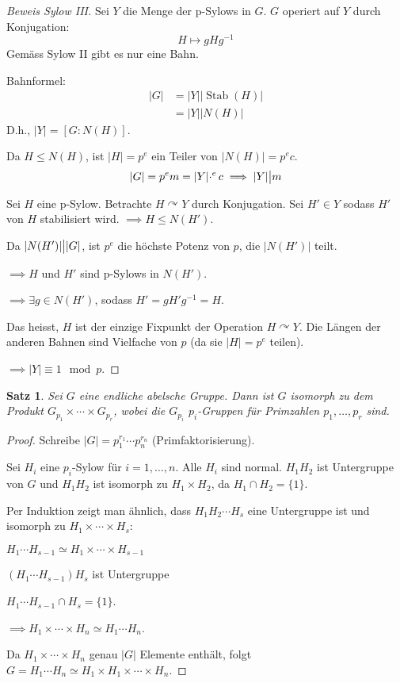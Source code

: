 \documentclass{article}
\theoremstyle{plain}
\newtheorem{theorem}{Satz}
\newcommand{\ug}{\leq}
\newcommand{\teilt}{\big{|}}
\newcommand{\iso}{\simeq}
\newcommand{\stab}{\mathop\text{Stab}}
\newcommand{\operateson}{\curvearrowright}
\begin{document}
\begin{proof}[Beweis Sylow III]
    Sei $Y$ die Menge der p-Sylows in $G$.
    $G$ operiert auf $Y$ durch Konjugation:
    $$H\mapsto gHg^{-1}$$
    Gemäss Sylow II gibt es nur eine Bahn.

    Bahnformel:
\begin{align*}
    |G|&=|Y||\stab(H)|\\
    &=|Y||N(H)|
\end{align*}
D.h., $|Y|=[G:N(H)]$.

Da $H\ug N(H)$, ist $|H|=p^e$ ein Teiler von $|N(H)|=p^ec$.
$$|G|=p^em=|Y|\cdotp^ec \implies |Y|\teilt m$$

Sei $H$ eine p-Sylow. Betrachte $H\operateson Y$ durch Konjugation. 
Sei $H'\in Y$ sodass $H'$ von $H$ stabilisiert wird.
$\implies H\ug N(H')$.

Da $|N(H')|\teilt|G|$, ist $p^e$ die höchste Potenz von $p$, die $|N(H')|$ teilt.

$\implies H$ und $H'$ sind p-Sylows in $N(H')$.

$\implies \exists g\in N(H')$, sodass $H'=gH'g^{-1}=H$.

Das heisst, $H$ ist der einzige Fixpunkt der Operation $H\operateson Y$. Die Längen der anderen Bahnen sind Vielfache von $p$ (da sie $|H|=p^e$ teilen).

$\implies |Y|\equiv1\mod p$.
\end{proof}

\begin{theorem}
Sei $G$ eine endliche abelsche Gruppe. Dann ist $G$ isomorph zu dem Produkt $G_{p_1}\times\cdots\times G_{p_r}$, wobei die $G_{p_i}$ $p_i$-Gruppen für Primzahlen $p_1,\ldots,p_r$ sind.
\end{theorem}
\begin{proof}
    Schreibe $|G|=p_1^{r_1}\cdots p_n^{r_n}$ (Primfaktorisierung).

    Sei $H_i$ eine $p_i$-Sylow für $i=1,\ldots,n$.
    Alle $H_i$ sind normal. 
    $H_1H_2$ ist Untergruppe von $G$ und $H_1H_2$ ist isomorph zu $H_1\times H_2$, da $H_1\cap H_2=\{1\}$.

Per Induktion zeigt man ähnlich, dass $H_1H_2\cdots H_s$ eine Untergruppe ist und isomorph zu $H_1\times\cdots \times H_s$:

$H_1\cdots H_{s-1} \iso H_1\times\cdots\times H_{s-1}$

$(H_1\cdots H_{s-1})H_s$ ist Untergruppe

$H_1\cdots H_{s-1}\cap H_s=\{1\}$.

$\implies H_1\times\cdots\times H_n \iso H_1\cdots H_n$.

Da $H_1\times\cdots\times H_n$ genau $|G|$ Elemente enthält, folgt $G=H_1\cdots H_n \iso H_1\times H_1\times\cdots\times H_n$.
\end{proof}
\end{document}
